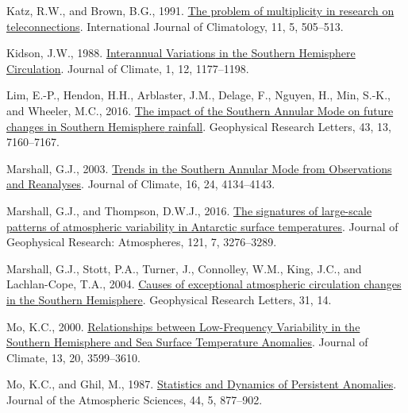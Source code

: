 \documentclass[12pt,oneside]{reedthesis}
\newlength{\cslhangindent}
\newenvironment{CSLReferences}[2] %
 {%
  \setlength{\parindent}{0pt}
  \ifodd #1 \everypar{\setlength{\hangindent}{\cslhangindent}}\ignorespaces\fi
  \ifnum #2 > 0
  \setlength{\parskip}{#2\baselineskip}
  \fi
 }%
 {}
\begin{document}
\begin{CSLReferences}{1}{0}
\leavevmode{}%
Katz, R.W., and Brown, B.G., 1991. \href{https://doi.org/10.1002/joc.3370110504}{The problem of multiplicity in research on teleconnections}. International Journal of Climatology, 11, 5, 505--513.

\leavevmode{}%
Kidson, J.W., 1988. \href{https://doi.org/10.1175/1520-0442(1988)001\%3C1177:IVITSH\%3E2.0.CO;2}{Interannual {Variations} in the {Southern Hemisphere Circulation}}. Journal of Climate, 1, 12, 1177--1198.

\leavevmode{}%
Lim, E.-P., Hendon, H.H., Arblaster, J.M., Delage, F., Nguyen, H., Min, S.-K., and Wheeler, M.C., 2016. \href{https://doi.org/10.1002/2016GL069453}{The impact of the {Southern Annular Mode} on future changes in {Southern Hemisphere} rainfall}. Geophysical Research Letters, 43, 13, 7160--7167.

\leavevmode{}%
Marshall, G.J., 2003. \href{https://doi.org/10.1175/1520-0442(2003)016\%3C4134:TITSAM\%3E2.0.CO;2}{Trends in the {Southern Annular Mode} from {Observations} and {Reanalyses}}. Journal of Climate, 16, 24, 4134--4143.

\leavevmode{}%
Marshall, G.J., and Thompson, D.W.J., 2016. \href{https://doi.org/10.1002/2015JD024665}{The signatures of large-scale patterns of atmospheric variability in {Antarctic} surface temperatures}. Journal of Geophysical Research: Atmospheres, 121, 7, 3276--3289.

\leavevmode{}%
Marshall, G.J., Stott, P.A., Turner, J., Connolley, W.M., King, J.C., and Lachlan-Cope, T.A., 2004. \href{https://doi.org/10.1029/2004GL019952}{Causes of exceptional atmospheric circulation changes in the {Southern Hemisphere}}. Geophysical Research Letters, 31, 14.

\leavevmode{}%
Mo, K.C., 2000. \href{https://doi.org/10.1175/1520-0442(2000)013\%3C3599:RBLFVI\%3E2.0.CO;2}{Relationships between {Low-Frequency Variability} in the {Southern Hemisphere} and {Sea Surface Temperature Anomalies}}. Journal of Climate, 13, 20, 3599--3610.

\leavevmode{}%
Mo, K.C., and Ghil, M., 1987. \href{https://doi.org/10.1175/1520-0469(1987)044\%3C0877:SADOPA\%3E2.0.CO;2}{Statistics and {Dynamics} of {Persistent Anomalies}}. Journal of the Atmospheric Sciences, 44, 5, 877--902.


\end{CSLReferences}
\end{document}
